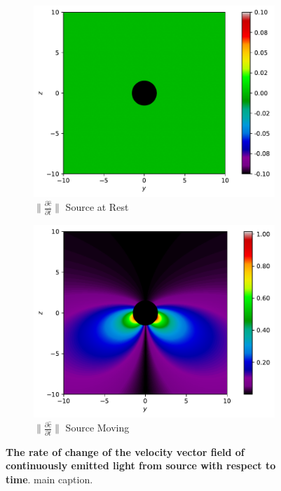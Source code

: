 \begin{figure}[H]
	\centering
	\begin{subfigure}{0.45\textwidth}
		\centering
		\includegraphics[width=\textwidth]{images/pdf/Rate_of_change_of_lights_velocity_field_with_respect_to_t_u_is_0.pdf}
		\caption{$\|\frac{\partial \underline{\hat{c}}}{\partial t}\|$ Source at Rest}
		\label{fig: Rate of change of lights velocity field with respect to time subfig_2}
	\end{subfigure}
	\begin{subfigure}{0.45\textwidth}
		\centering
		\includegraphics[width=\textwidth]{images/pdf/Rate_of_change_of_lights_velocity_field_with_respect_to_t.pdf}
		\caption{$\|\frac{\partial \underline{\hat{c}}}{\partial t}\|$ Source Moving}
		\label{fig: Rate of change of lights velocity field with respect to time subfig_3}
	\end{subfigure}
	\caption{\textbf{The rate of change of the velocity vector field of continuously emitted light from source with respect to time}. main caption.}
	\label{fig: Rate of change of lights velocity field with respect to time}
\end{figure}

